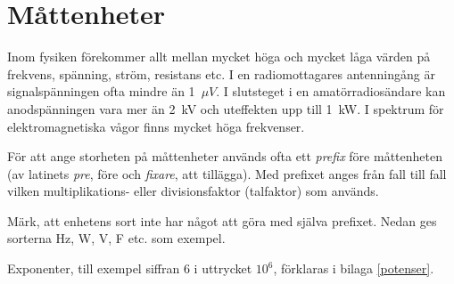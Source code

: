 \chapter{Måttenheter}

  Inom fysiken förekommer allt mellan mycket höga och mycket låga
  värden på frekvens, spänning, ström, resistans etc.
  I en radiomottagares antenningång är signalspänningen ofta mindre än
  1~\(\mu V\).
  I slutsteget i en amatörradiosändare kan anodspänningen vara mer än 2~kV och
  uteffekten upp till 1~kW.
  I spektrum för elektromagnetiska vågor finns mycket höga frekvenser.

  För att ange storheten på måttenheter används ofta ett \emph{prefix} före
  måttenheten (av latinets \emph{pre}, före och \emph{fixare}, att tillägga).
  Med prefixet anges från fall till fall vilken multiplikations- eller
  divisionsfaktor (talfaktor) som används.
 
  Märk, att enhetens sort inte har något att göra med själva prefixet.
  Nedan ges sorterna Hz, W, V, F etc. som exempel.

  Exponenter, till exempel siffran 6 i uttrycket \(10^6\), förklaras i
  bilaga \ref{potenser}.

